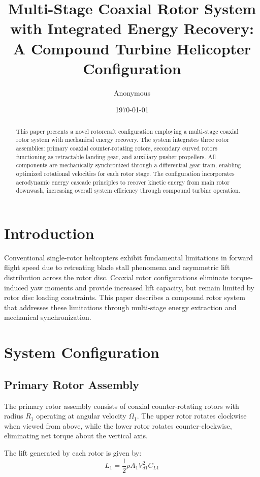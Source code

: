 \documentclass[12pt,a4paper]{article}
\title{Multi-Stage Coaxial Rotor System with Integrated Energy Recovery: A Compound Turbine Helicopter Configuration}
\author{Anonymous}
\date{\today}
\begin{document}
\maketitle

\begin{abstract}
This paper presents a novel rotorcraft configuration employing a multi-stage coaxial rotor system with mechanical energy recovery. The system integrates three rotor assemblies: primary coaxial counter-rotating rotors, secondary curved rotors functioning as retractable landing gear, and auxiliary pusher propellers. All components are mechanically synchronized through a differential gear train, enabling optimized rotational velocities for each rotor stage. The configuration incorporates aerodynamic energy cascade principles to recover kinetic energy from main rotor downwash, increasing overall system efficiency through compound turbine operation.
\end{abstract}

\section{Introduction}

Conventional single-rotor helicopters exhibit fundamental limitations in forward flight speed due to retreating blade stall phenomena and asymmetric lift distribution across the rotor disc. Coaxial rotor configurations eliminate torque-induced yaw moments and provide increased lift capacity, but remain limited by rotor disc loading constraints. This paper describes a compound rotor system that addresses these limitations through multi-stage energy extraction and mechanical synchronization.

\section{System Configuration}

\subsection{Primary Rotor Assembly}

The primary rotor assembly consists of coaxial counter-rotating rotors with radius $R_1$ operating at angular velocity $\Omega_1$. The upper rotor rotates clockwise when viewed from above, while the lower rotor rotates counter-clockwise, eliminating net torque about the vertical axis.

The lift generated by each rotor is given by:
\begin{equation}
L_1 = \frac{1}{2}\rho A_1 V_{d1}^2 C_{L1}
\end{equation}
\end{document}
